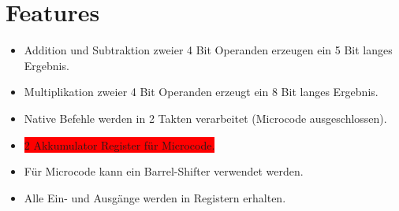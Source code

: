 \documentclass[11pt]{report}
\begin{document}
	\section{Features}
	\begin{itemize}
		\item Addition und Subtraktion zweier 4 Bit Operanden erzeugen ein 5 Bit langes Ergebnis.
		\item Multiplikation zweier 4 Bit Operanden erzeugt ein 8 Bit langes Ergebnis.
		\item Native Befehle werden in 2 Takten verarbeitet (Microcode ausgeschlossen).
		\item \colorbox{red}{2 Akkumulator Register für Microcode.}
		\item Für Microcode kann ein Barrel-Shifter verwendet werden.
		\item Alle Ein- und Ausgänge werden in Registern erhalten.
	\end{itemize}
	
\end{document}
